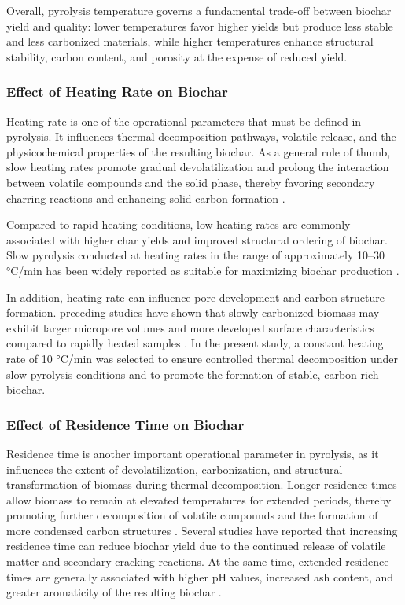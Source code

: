 \vspace{0.3em}

Overall, pyrolysis temperature governs a fundamental trade-off between biochar yield and quality: lower temperatures favor higher yields but produce less stable and less carbonized materials, while higher temperatures enhance structural stability, carbon content, and porosity at the expense of reduced yield.


\subsubsection*{Effect of Heating Rate on Biochar}

Heating rate is one of the operational parameters that must be defined in pyrolysis. It influences thermal decomposition pathways, volatile release, and the physicochemical properties of the resulting biochar. As a general rule of thumb, slow heating rates promote gradual devolatilization and prolong the interaction between volatile compounds and the solid phase, thereby favoring secondary charring reactions and enhancing solid carbon formation \cite{awad-2024,brunner-1980}.

\vspace{0.3em}

Compared to rapid heating conditions, low heating rates are commonly associated with higher char yields and improved structural ordering of biochar. Slow pyrolysis conducted at heating rates in the range of approximately 10–30 °C/min has been widely reported as suitable for maximizing biochar production \cite{awad-2024}.

\vspace{0.3em}

In addition, heating rate can influence pore development and carbon structure formation. preceding studies have shown that slowly carbonized biomass may exhibit larger micropore volumes and more developed surface characteristics compared to rapidly heated samples \cite{awad-2024,song-2025}.
In the present study, a constant heating rate of 10 °C/min was selected to ensure controlled thermal decomposition under slow pyrolysis conditions and to promote the formation of stable, carbon-rich biochar.


\subsubsection*{Effect of Residence Time on Biochar}
Residence time is another important operational parameter in pyrolysis, as it influences the extent of devolatilization, carbonization, and structural transformation of biomass during thermal decomposition. Longer residence times allow biomass to remain at elevated temperatures for extended periods, thereby promoting further decomposition of volatile compounds and the formation of more condensed carbon structures \cite{leng-2018,wang-2019}. Several studies have reported that increasing residence time can reduce biochar yield due to the continued release of volatile matter and secondary cracking reactions. At the same time, extended residence times are generally associated with higher pH values, increased ash content, and greater aromaticity of the resulting biochar \cite{sun-2016,wijitkosum-2023}.

